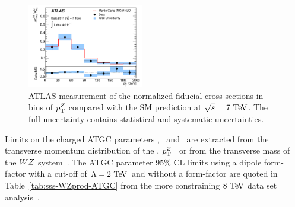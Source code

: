 \begin{figure}[htbp]
  \begin{center}
  \includegraphics[width=0.45\textwidth]{figures/sss-inclboson-diboson-wzprod-ptZ.pdf}
  \caption{ATLAS measurement of the normalized fiducial cross-sections in bins of $p_{\mathrm{T}}^Z$ compared with the SM prediction at $\rts = 7\TeV$. The full uncertainty contains statistical and systematic uncertainties.}
\label{fig:sss-WZprod-ptZ-det}
\end{center}
\end{figure}


Limits on the charged ATGC parameters \dkz, \lz\ and \gz\ are extracted from the transverse momentum distribution
of the \Zboson, $p_{\mathrm{T}}^Z$~\cite{Aad:2012twa} or from the transverse mass of the $WZ$ system~\cite{Aad:2016ett}. 
The ATGC parameter 95\% CL limits using a dipole form-factor with a cut-off of $\Lambda=2\TeV$ and without a form-factor are quoted 
in Table~\ref{tab:sss-WZprod-ATGC} from the more constraining $8\TeV$ data set analysis~\cite{Aad:2016ett}.



